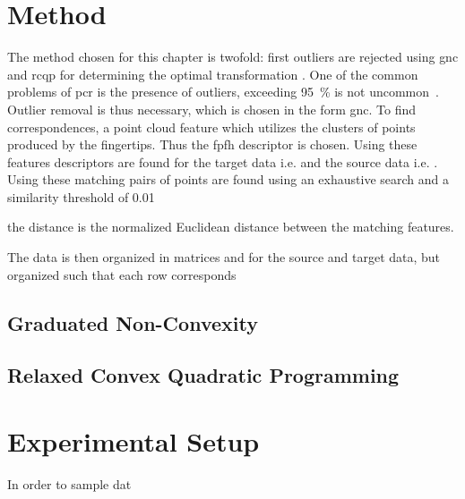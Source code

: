 \section{Method} \label{sec:2-pose-estimation-method}

The method chosen for this chapter is twofold: first outliers are rejected using \gls{gnc} and \gls{rcqp} for determining the optimal transformation . One of the common problems of \gls{pcr} is the presence of outliers, exceeding \SI{95}{\percent} is not uncommon~\cite{guaranteed-outlier-removal-for-point-cloud-registration-with-correspondences}. Outlier removal is thus necessary, which is chosen in the form \gls{gnc}. To find correspondences, a point cloud feature which utilizes the clusters of points produced by the fingertips. Thus the \gls{fpfh} descriptor is chosen. Using these features descriptors  are found for the target data i.e.  and the source data  i.e. . Using these matching pairs of points are found using an exhaustive search and a similarity threshold of \num{0.01}

the distance is the normalized Euclidean distance between the matching features.

The data is then organized in matrices  and  for the source and target data, but organized such that each row corresponds 






\subsection{Graduated Non-Convexity} \label{subs:2-pose-estimation-graduated-non-convexity}





\subsection{Relaxed Convex Quadratic Programming} \label{subs:2-pose-estimation-relaxed-convex-quadratic-programming}



\section{Experimental Setup} \label{sec:2-pose-estimation-experimental-setup}

In order to sample dat



